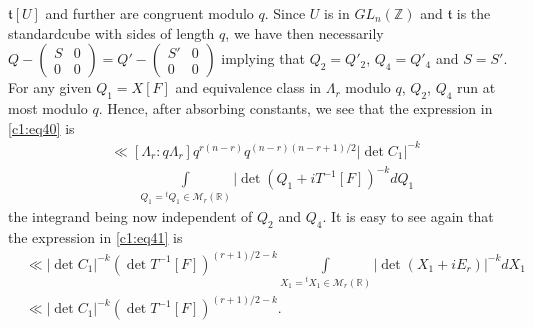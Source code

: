   $\mathfrak{t}[U]$ and further are congruent modulo $q$. Since $U$ is
  in $GL_{n}(\mathbb{Z})$ and $\mathfrak{t}$ is the
  standard\pageoriginale cube with sides of length $q$, we have then
  necessarily $Q-\left(\begin{smallmatrix} S & 0\\ 0 & 0
  \end{smallmatrix}\right)=Q'-\left(\begin{smallmatrix} S' & 0\\ 0 & 0
  \end{smallmatrix}\right)$ implying that $Q_{2}=Q'_{2}$,
  $Q_{4}=Q'_{4}$ and $S=S'$. For any given $Q_{1}=X[F]$ and
  equivalence class in $\Lambda_{r}$ modulo $q$, $Q_{2}$, $Q_{4}$ run
  at most modulo $q$. Hence, after absorbing constants, we see that
  the expression in \eqref{c1:eq40} is 
\begin{align*}
&\ll [\Lambda_{r}:q\Lambda_{r}]q^{r(n-r)}q^{(n-r)(n-r+1)/2}|\det
C_{1}|^{-k}\\
&\qquad\int\limits_{Q_{1}={}^{t}Q_{1}\in\mathscr{M}_{r}(\mathbb{R})}|\det
(Q_{1}+iT^{-1}[F])^{-k}dQ_{1}\tag{41}\label{c1:eq41} 
\end{align*}
the integrand being now independent of $Q_{2}$ and $Q_{4}$. It is easy
to see again that the expression in \eqref{c1:eq41} is
\begin{align*}
&\ll |\det C_{1}|^{-k}(\det
  T^{-1}[F])^{(r+1)/2-k}\int\limits_{X_{1}={}^{t}X_{1}\in
    \mathscr{M}_{r}(\mathbb{R})}|\det (X_{1}+iE_{r})|^{-k}dX_{1}\\
&\ll |\det C_{1}|^{-k}(\det T^{-1}[F])^{(r+1)/2-k}.\tag{42}\label{c1:eq42}
\end{align*}

